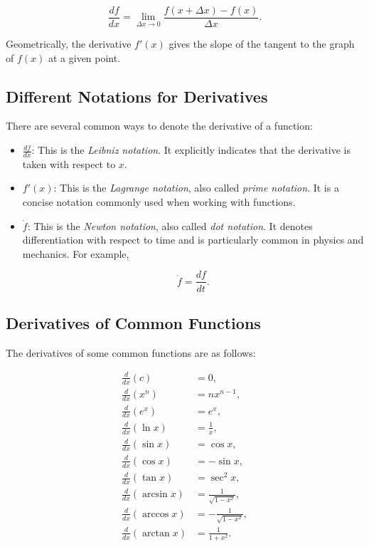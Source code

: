 \documentclass[12pt]{article}
\begin{document}
\[
\frac{df}{dx}
=
\lim_{\Delta x \to 0}
\frac{f(x+\Delta x)-f(x)}{\Delta x}.
\]

Geometrically, the derivative \(f'(x)\) gives the slope of the tangent to the graph of \(f(x)\) at a given point.


\subsection{Different Notations for Derivatives}

There are several common ways to denote the derivative of a function:

\begin{itemize}

\item $\frac{df}{dx}$: This is the \emph{Leibniz notation}. It explicitly indicates that the derivative is taken with respect to \(x\).

\item $f'(x)$: This is the \emph{Lagrange notation}, also called \emph{prime notation}. It is a concise notation commonly used when working with functions.

\item $\dot{f}$: This is the \emph{Newton notation}, also called \emph{dot notation}. It denotes differentiation with respect to time and is particularly common in physics and mechanics. For example,

$$
\dot{f} = \frac{df}{dt}.
$$

\end{itemize}



\subsection{Derivatives of Common Functions}

The derivatives of some common functions are as follows:

\begin{align*}
\frac{d}{dx}(c) &= 0, \\
\frac{d}{dx}(x^n) &= nx^{n-1}, \\
\frac{d}{dx}(e^x) &= e^x, \\
\frac{d}{dx}(\ln x) &= \frac{1}{x}, \\
\frac{d}{dx}(\sin x) &= \cos x, \\
\frac{d}{dx}(\cos x) &= -\sin x, \\
\frac{d}{dx}(\tan x) &= \sec^2 x, \\
\frac{d}{dx}(\arcsin x) &= \frac{1}{\sqrt{1-x^2}}, \\
\frac{d}{dx}(\arccos x) &= -\frac{1}{\sqrt{1-x^2}}, \\
\frac{d}{dx}(\arctan x) &= \frac{1}{1+x^2}.
\end{align*}
\end{document}
